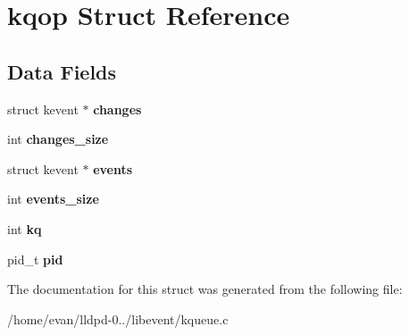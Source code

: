 \section{kqop \-Struct \-Reference}
\label{structkqop}
\subsection*{\-Data \-Fields}
\begin{DoxyCompactItemize}
\item 
struct kevent $\ast$ {\bfseries changes}\label{structkqop_aa77d5c66455d1d8c66718a2c3a3d2ca5}

\item 
int {\bfseries changes\-\_\-size}\label{structkqop_a93791bd5546d31e77878190a7ad3c3ce}

\item 
struct kevent $\ast$ {\bfseries events}\label{structkqop_ac4b7894707b47b577951136ff0c44929}

\item 
int {\bfseries events\-\_\-size}\label{structkqop_aa07ff13f4952ddfae3213b2b14a81dbe}

\item 
int {\bfseries kq}\label{structkqop_a2673b2ab2939649281ca9a63e67228e2}

\item 
pid\-\_\-t {\bfseries pid}\label{structkqop_ae0d46a978d5cd6707411f276ad869b9c}

\end{DoxyCompactItemize}


\-The documentation for this struct was generated from the following file\-:\begin{DoxyCompactItemize}
\item 
/home/evan/lldpd-\/0../libevent/kqueue.\-c\end{DoxyCompactItemize}
